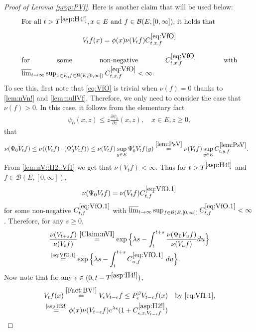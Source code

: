\documentclass[12pt,a4paper]{amsart}
\numberwithin{equation}{section}
\theoremstyle{plain}
\theoremstyle{definition}
\theoremstyle{remark}
\begin{document}
\begin{proof}[Proof of Lemma \ref{prop:PVf}]
	
	Here is another claim that will be used below:
\begin{equation}
\begin{minipage}{0.9\textwidth}
	For all $t> T^{\eqref{asp:H4!}}, x\in E$ and $f\in \mathcal B(E,[0,\infty])$, it holds that \[V_t f(x) = \phi(x) \nu(V_tf) C^{\eqref{eq:VfO}}_{t,x,f}\] for some non-negative $C^{\eqref{eq:VfO}}_{t,x,f}$ with $\varlimsup_{t\to \infty} \sup_{x\in E, f\in \mathcal B(E,[0,\infty])} C^{\eqref{eq:VfO}}_{t,x,f} <\infty$.
\end{minipage} \label{eq:VfO}
\end{equation}
	To see this, first note that \eqref{eq:VfO} is trivial when $\nu(f) = 0$ thanks to \eqref{lem:nVn!} and \eqref{lem:nullVf}.
	Therefore, we only need to consider the case that $\nu(f)>0$.
	In this case, it follows from the elementary fact
\begin{align}\label{e:derofpsi0}
	\psi_0(x,z)
	\leq z \frac{\partial \psi_0}{\partial z}(x,z),
	\quad x\in E, z\geq 0,
\end{align}
	that
\begin{align}
	&\nu(\Psi_0 V_tf)
	\leq \nu((V_tf)\cdot (\Psi_0' V_tf)) \leq \nu(V_tf) \sup_{y\in E} \Psi_0' V_tf(y)
	\overset{\eqref{lem:PsV}}= \nu(V_tf) \sup_{y\in E} C^{\eqref{lem:PsV}}_{t,y,f}.
\end{align}
	From \eqref{lem:nV::H2::Vf1}  we get that $\nu(V_tf) <\infty$.
	Thus for $t> T^{\eqref{asp:H4!}}$ and $f\in \mathcal B(E,[0,\infty])$,
\begin{equation}
	\nu(\Psi_0 V_t f)  = \nu(V_tf) C^{\eqref{eq:VfO.1}}_{t,f} \label{eq:VfO.1}
\end{equation}
	for some non-negative $C^{\eqref{eq:VfO.1}}_{t,f} $ with $\varlimsup_{t\to \infty} \sup_{f\in \mathcal B(E,[0,\infty])}C^{\eqref{eq:VfO.1}}_{t,f}  < \infty$.
	Therefore, for any $s\geq 0$,
\begin{align}
	&  \frac{\nu(V_{t+s} f)} {\nu(V_t f)} \overset{\eqref{Claim:nVI}}= \exp\Big\{ \lambda s - \int_t^{t+s} \frac{\nu(\Psi_0 V_u f) }{\nu(V_u f)} du\Big\}
	\\&\label{eq:VfO.2} \overset{\text{\eqref{eq:VfO.1}}}= \exp\Big\{ \lambda s - \int_t^{t+s} C^{\eqref{eq:VfO.1}}_{u,f} ~du\Big\}.
\end{align}
Now note that for any $\epsilon\in (0, t- T^{\eqref{asp:H4!}})$,
\begin{align}
	&V_{t}f(x) \overset{\eqref{Fact:BV!}}= V_{\epsilon} V_{t-\epsilon} f\leq P_\epsilon^\beta V_{t-\epsilon} f(x)\quad\text{by \eqref{eq:Vf1.1}},
	\\& \overset{\text{\eqref{asp:H2!}}}= \phi(x) \nu(V_{t-\epsilon}f) e^{\lambda  \epsilon} (1+C_{\epsilon,x, V_{t-\epsilon} f}^{\eqref{asp:H2!}} )

\end{align}
\end{proof}
\end{document}
